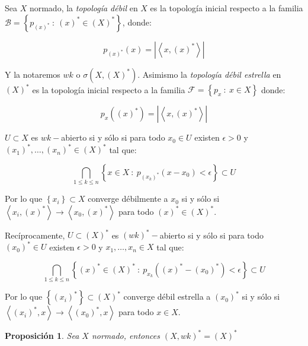 \documentclass[11pt]{article}
\newcommand{\B}{\mathcal{B}}
\newcommand{\F}{\mathcal{F}}
\newcommand\tq{~:~}
\newcommand{\dual}[1]{\left(#1\right)^{\ast}}
\newcommand{\abs}[1]{\left\lvert#1\right\rvert}
\newcommand{\ip}[1]{\left\langle#1\right\rangle}
\newcommand{\sett}[1]{\left\lbrace#1\right\rbrace}
\newcommand{\Bigcap}[2]{\bigcap\limits_{#1}{#2}}
\numberwithin{theorem}{subsection}
\newtheorem{proposition}[theorem]{Proposici\'on}
\newenvironment{definition}[1][Definici\'on]{\begin{trivlist}
		\item[\hskip \labelsep {\bfseries #1}]}{\end{trivlist}}
\newenvironment{remark}[1][Observaci\'on]{\begin{trivlist}
		\item[\hskip \labelsep {\bfseries #1}]}{\end{trivlist}}
\begin{document}
\begin{definition}
	Sea $X$ normado, la \textit{topolog\'ia d\'ebil} en $X$ es la topolog\'ia inicial respecto a la familia $\B = \sett{p_{\dual{x}} \tq \dual{x} \in \dual{X}}$, donde:
	
	\begin{equation*}
		p_{\dual{x}}(x) = \abs{\ip{x,\dual{x}}}
	\end{equation*}
	
	Y la notaremos $wk$ o $\sigma(X,\dual{X})$. Asimismo la \textit{topolog\'ia d\'ebil estrella} en $\dual{X}$ es la topolog\'ia inicial respecto a la familia $\F = \sett{p_x \tq x \in X}$ donde:
	
	\begin{equation*}
		p_x(\dual{x}) = \abs{\ip{x,\dual{x}}}
	\end{equation*}
	
\end{definition}

\begin{remark}
	$U \subset X$ es $wk-$abierto si y s\'olo si para todo $x_0 \in U$ existen $\epsilon > 0$ y $\dual{x_1}, \dots, \dual{x_n} \in \dual{X}$ tal que:
	
	\begin{equation*}
		\Bigcap{1 \leq k \leq n}{\sett{x \in X \tq p_{\dual{x_k}}(x-x_0) < \epsilon}} \subset U
	\end{equation*}
	
	Por lo que $\sett{x_i} \subset X$ converge d\'ebilmente a $x_0$ si y s\'olo si $\ip{x_i,\dual{x}} \rightarrow \ip{x_0,\dual{x}}$ para todo $\dual{x} \in \dual{X}$.
	
	\bigskip
	
	Rec\'iprocamente, $U \subset \dual{X}$ es $\dual{wk}-$abierto si y s\'olo si para todo $\dual{x_0} \in U$ existen $\epsilon > 0$ y $x_1, \dots, x_n \in X$ tal que:
	
	\begin{equation*}
	\Bigcap{1 \leq k \leq n}{\sett{\dual{x} \in \dual{X} \tq p_{x_k}(\dual{x}-\dual{x_0}) < \epsilon}} \subset U
	\end{equation*}
	
	Por lo que $\sett{\dual{x_i}} \subset \dual{X}$ converge d\'ebil estrella a $\dual{x_0}$ si y s\'olo si $\ip{\dual{x_i},x} \rightarrow \ip{\dual{x_0},x}$ para todo $x \in X$.
	
	
\end{remark}

\begin{proposition}
	\label{El dual a la topologia debil es la dual fuerte}
	Sea $X$ normado, entonces $\dual{X,wk} = \dual{X}$
\end{proposition}
\end{document}
